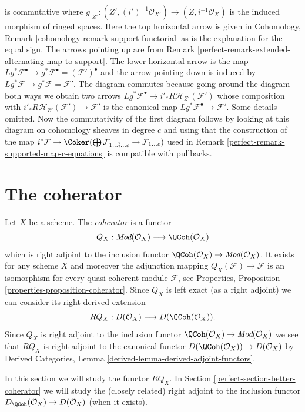 \begin{remark}
$$$$
is commutative where $g|_{Z'} : (Z', (i')^{-1}\mathcal{O}_{X'}) \to
(Z, i^{-1}\mathcal{O}_X)$ is the induced morphism of ringed spaces.
Here the top horizontal arrow is given in
Cohomology, Remark \ref{cohomology-remark-support-functorial}
as is the explanation for the equal sign.
The arrows pointing up are from
Remark \ref{perfect-remark-extended-alternating-map-to-support}.
The lower horizontal arrow is the map $Lg^*\mathcal{F}^\bullet
\to g^*\mathcal{F}^\bullet = (\mathcal{F}')^\bullet$ and the arrow
pointing down is induced by
$Lg^*\mathcal{F} \to g^*\mathcal{F} = \mathcal{F}'$.
The diagram commutes because going around the diagram both ways
we obtain two arrows $Lg^*\mathcal{F}^\bullet \to
i'_*R\mathcal{H}_{Z'}(\mathcal{F}')$ whose composition with
$i'_*R\mathcal{H}_{Z'}(\mathcal{F}') \to \mathcal{F}'$
is the canonical map $Lg^*\mathcal{F}^\bullet \to \mathcal{F}'$.
Some details omitted. Now the commutativity of the first diagram
follows by looking at this diagram on cohomology sheaves in degree
$c$ and using that the construction of the map
$i^*\mathcal{F} \to
\Coker(\bigoplus \mathcal{F}_{1 \ldots \hat i \ldots c} \to
\mathcal{F}_{1 \ldots c})$
used in Remark \ref{perfect-remark-supported-map-c-equations}
is compatible with pullbacks.
\end{remark}

\section{The coherator}
\label{perfect-section-coherator}
Let $X$ be a scheme. The {\it coherator} is a functor
$$
Q_X :
\textit{Mod}(\mathcal{O}_X)
\longrightarrow
\QCoh(\mathcal{O}_X)
$$
which is right adjoint to the inclusion functor
$\QCoh(\mathcal{O}_X) \to \textit{Mod}(\mathcal{O}_X)$.
It exists for any scheme $X$ and moreover the adjunction mapping
$Q_X(\mathcal{F}) \to \mathcal{F}$ is an isomorphism for every
quasi-coherent module $\mathcal{F}$, see
Properties, Proposition \ref{properties-proposition-coherator}.
Since $Q_X$ is left exact (as a right adjoint) we can consider its
right derived extension
$$
RQ_X :
D(\mathcal{O}_X)
\longrightarrow
D(\QCoh(\mathcal{O}_X)).
$$
Since $Q_X$ is right adjoint to the inclusion functor
$\QCoh(\mathcal{O}_X) \to \textit{Mod}(\mathcal{O}_X)$
we see that $RQ_X$ is right adjoint to the canonical functor
$D(\QCoh(\mathcal{O}_X)) \to D(\mathcal{O}_X)$ by
Derived Categories, Lemma \ref{derived-lemma-derived-adjoint-functors}.

\medskip\noindent
In this section we will study the functor $RQ_X$. In
Section \ref{perfect-section-better-coherator}
we will study the (closely related) right adjoint to the inclusion functor
$D_\QCoh(\mathcal{O}_X) \to D(\mathcal{O}_X)$ (when it exists).

